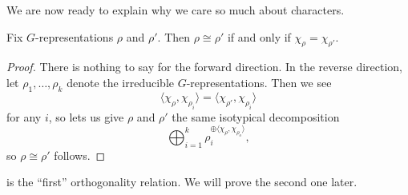 \documentclass[../main.tex]{subfiles}
\begin{document}
We are now ready to explain why we care so much about characters.
\begin{corollary}
	Fix $G$-representations $\rho$ and $\rho'$. Then $\rho\cong\rho'$ if and only if $\chi_\rho=\chi_{\rho'}$.
\end{corollary}
\begin{proof}
	There is nothing to say for the forward direction. In the reverse direction, let $\rho_1,\ldots,\rho_k$ denote the irreducible $G$-representations. Then we see
	\[\langle\chi_\rho,\chi_{\rho_i}\rangle=\langle\chi_{\rho'},\chi_{\rho_i}\rangle\]
	for any $i$, so  lets us give $\rho$ and $\rho'$ the same isotypical decomposition
	\[\bigoplus_{i=1}^k\rho_i^{\oplus\langle\chi_\rho,\chi_{\rho_o}\rangle},\]
	so $\rho\cong\rho'$ follows.
\end{proof}
 is the ``first'' orthogonality relation. We will prove the second one later.
\end{document}
